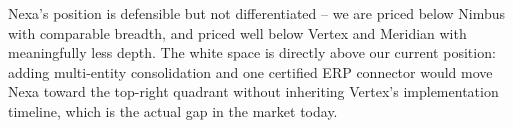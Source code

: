 \begin{tcolorbox}[infobox, title={\faBullseye\ Reading the map}]
Nexa's position is defensible but not differentiated -- we are priced below Nimbus with
comparable breadth, and priced well below Vertex and Meridian with meaningfully less depth. The
white space is directly above our current position: adding multi-entity consolidation and one
certified ERP connector would move Nexa toward the top-right quadrant without inheriting
Vertex's implementation timeline, which is the actual gap in the market today.
\end{tcolorbox}
